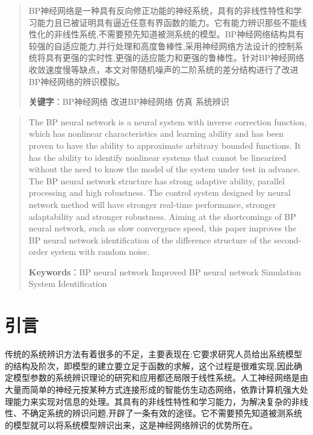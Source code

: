 \documentclass[UTF8]{ctexart}
\begin{document}
 \begin{abstract}
BP神经网络是一种具有反向修正功能的神经系统，具有的非线性特性和学习能力且已被证明具有逼近任意有界函数的能力。它有能力辨识那些不能线性化的非线性系统,不需要预先知道被测系统的模型。BP神经网络结构具有较强的自适应能力,并行处理和高度鲁棒性,采用神经网络方法设计的控制系统将具有更强的实时性,更强的适应能力和更强的鲁棒性。针对BP神经网络收敛速度慢等缺点，本文对带随机噪声的二阶系统的差分结构进行了改进BP神经网络的辨识模拟。
	
	\textbf{关键字}：\quad BP神经网络 \quad 改进BP神经网络 \quad 仿真 \quad 系统辨识

\end{abstract}

\renewcommand\abstractname{Abstract}
\begin{abstract}
The BP neural network is a neural system with inverse correction function, which has nonlinear characteristics and learning ability and has been proven to have the ability to approximate arbitrary bounded functions. It has the ability to identify nonlinear systems that cannot be linearized without the need to know the model of the system under test in advance. The BP neural network structure has strong adaptive ability, parallel processing and high robustness. The control system designed by neural network method will have stronger real-time performance, stronger adaptability and stronger robustness. Aiming at the shortcomings of BP neural network, such as slow convergence speed, this paper improves the BP neural network identification of the difference structure of the second-order system with random noise.

\textbf{Keywords}：\quad BP neural network \quad Improved BP neural network \quad Simulation \quad System Identification
\end{abstract}

\section{引言}
传统的系统辨识方法有着很多的不足，主要表现在:它要求研究人员给出系统模型的结构及阶次，即模型的建立要立足于函数的求解，这个过程是很难实现,因此确定模型参数的系统辨识理论的研究和应用都还局限于线性系统。人工神经网络是由大量而简单的神经元按某种方式连接形成的智能仿生动态网络，依靠计算机强大处理能力来实现对信息的处理。其具有的非线性特性和学习能力，为解决复杂的非线性、不确定系统的辨识问题,开辟了一条有效的途径。它不需要预先知道被测系统的模型就可以将系统模型辨识出来，这是神经网络辨识的优势所在。
\end{document}

